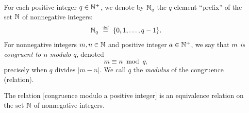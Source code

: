  
For each positive integer $q \in \mathbb{N}^+$, we denote by $\mathbb{N}_q$ the $q$-element ``prefix'' of the set $\mathbb{N}$ of nonnegative integers:
\[ \mathbb{N}_q \ \stackrel{\mbox{{\tiny def}}}{=} \ \{0, 1, \ldots, q-1\} . \]
For nonnegative integers $m, n \in \mathbb{N}$ and positive integer $a \in \mathbb{N}^+$, we say that {\em $m$ is congruent to $n$ modulo $q$}, denoted
\[ m \equiv n \bmod q, \]
precisely when $q \mbox{ divides } |m-n|$.  We call $q$ the {\it modulus} of the congruence (relation).

\begin{prop}
\label{thm:CONGisEQUIVALENCE-REL}
The relation [congruence modulo a positive integer] is an equivalence relation on the set $\mathbb{N}$ of nonnegative integers.
\end{prop}

